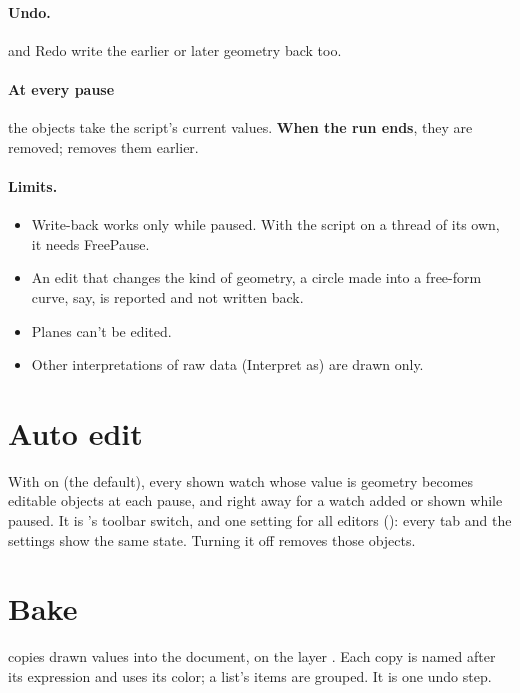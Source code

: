 \paragraph{Undo.}  and Redo write the earlier or later geometry back too.

\paragraph{At every pause} the objects take the script's current values. \textbf{When the run ends}, they are
removed;  removes them earlier.

\paragraph{Limits.}
\begin{itemize}
  \item Write-back works only while paused. With the script on a thread of its own, it needs FreePause.
  \item An edit that changes the kind of geometry, a circle made into a free-form curve, say, is reported
        and not written back.
  \item Planes can't be edited.
  \item Other interpretations of raw data (Interpret as) are drawn only.
\end{itemize}

\section{Auto edit}\label{sec:autoedit}

With  on (the default), every shown watch whose value is geometry becomes editable objects
at each pause, and right away for a watch added or shown while paused. It is 's toolbar switch,
and one setting for all editors (): every  tab and the settings show the same
state. Turning it off removes those objects.

\section{Bake}\label{sec:bake}

 copies drawn values into the document, on the layer . Each copy
is named after its expression and uses its color; a list's items are grouped. It is one undo step.

